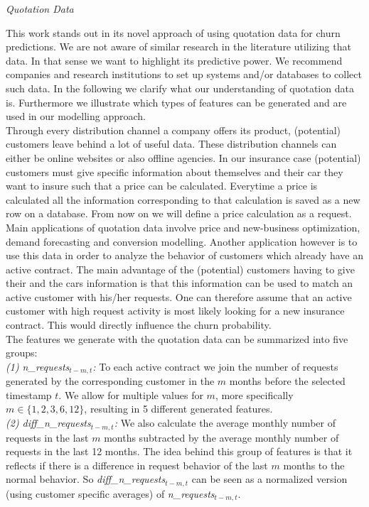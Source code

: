 \documentclass[12pt,titlepage]{article}
\begin{document}
\textit{Quotation Data} \par
This work stands out in its novel approach of using quotation data for churn predictions. We are not aware of similar research in the literature utilizing that data. In that sense we want to highlight its predictive power. We recommend companies and research institutions to set up systems and/or databases to collect such data. In the following we clarify what our understanding of quotation data is. Furthermore we illustrate which types of features can be generated and are used in our modelling approach.\\
Through every distribution channel a company offers its product, (potential) customers leave behind a lot of useful data. These distribution channels can either be online websites or also offline agencies. In our insurance case (potential) customers must give specific information about themselves and their car they want to insure such that a price can be calculated. Everytime a price is calculated all the information corresponding to that calculation is saved as a new row on a database. From now on we will define a price calculation as a request.\\
Main applications of quotation data involve price and new-business optimization, demand forecasting and conversion modelling. Another application however is to use this data in order to analyze the behavior of customers which already have an active contract. The main advantage of the (potential) customers having to give their and the cars information is that this information can be used to match an active customer with his/her requests. One can therefore assume that an active customer with high request activity is most likely looking for a new insurance contract. This would directly influence the churn probability. \\
The features we generate with the quotation data can be summarized into five groups: \\
\textit{(1) n\_requests$_{t - m, t}$:} To each active contract we join the number of requests generated by the corresponding customer in the $m$ months before the selected timestamp $t$. We allow for multiple values for $m$, more specifically $m \in \{ 1, 2, 3, 6, 12\}$, resulting in 5 different generated features. \\
\textit{(2) diff\_n\_requests$_{t - m, t}$:} We also calculate the average monthly number of requests in the last $m$ months subtracted by the average monthly number of requests in the last 12 months. The idea behind this group of features is that it reflects if there is a difference in request behavior of the last $m$ months to the normal behavior. So \textit{diff\_n\_requests$_{t - m, t}$} can be seen as a normalized version (using customer specific averages) of \textit{n\_requests$_{t - m, t}$}. \\
\end{document}
